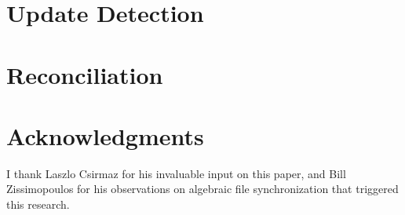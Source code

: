 \documentclass[12pt]{article}
\begin{document}




\section{Update Detection}







\section{Reconciliation}















\section{Acknowledgments}

I thank Laszlo Csirmaz for his invaluable input on this paper,
and Bill Zissimopoulos for his observations on algebraic file synchronization that triggered this research.

\begin{thebibliography}{99}



\end{thebibliography}
\end{document}
